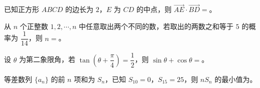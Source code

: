 \begin{question}
已知正方形 $ABCD$ 的边长为 $2$，$E$ 为 $CD$ 的中点，则 $\overrightarrow{AE}\cdot\overrightarrow{BD}=$\gkblank{}。

\end{question}
\begin{question}
从 $n$ 个正整数 $1,2,\cdots,n$ 中任意取出两个不同的数，若取出的两数之和等于 $5$ 的概率为 $\dfrac1{14}$，则 $n=$\gkblank{}。

\end{question}
\begin{question}
设 $\theta$ 为第二象限角，若 $\tan\left(\theta+\dfrac\pi4\right)=\dfrac12$，则 $\sin\theta+\cos\theta=$\gkblank{}。

\end{question}
\begin{question}
等差数列 $\{a_n\}$ 的前 $n$ 项和为 $S_n$，已知 $S_{10}=0$，$S_{15}=25$，则 $nS_n$ 的最小值为\gkblank{}。

\end{question}

